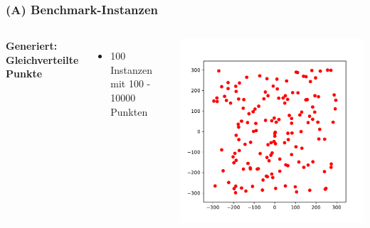 \documentclass[aspectratio=169]{beamer}
\begin{document}
\begin{frame}
	\frametitle{(A) Benchmark-Instanzen}
	\begin{columns}[c] %
	
	\textbf{Generiert: Gleichverteilte Punkte}
	\begin{itemize}
		\item 100 Instanzen mit 100 - 10000 Punkten
	\end{itemize}
	
	\includegraphics[scale=.5]{random.pdf}
	

	\end{columns}
	\end{frame}

\end{document}
